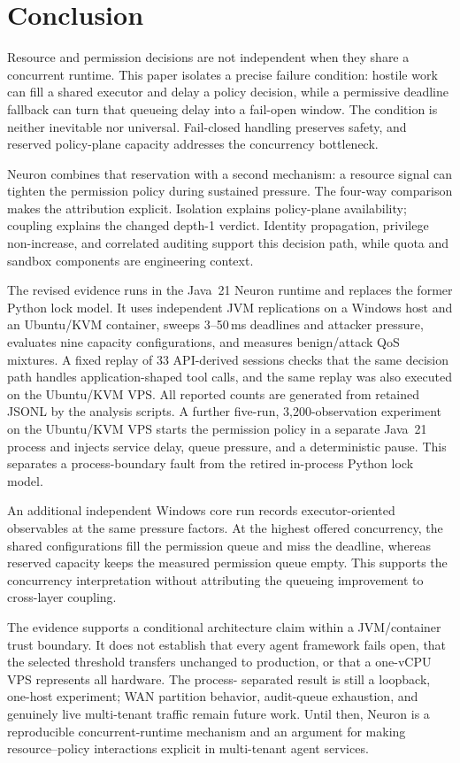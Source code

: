 \section{Conclusion}
\label{sec:conc}

Resource and permission decisions are not independent when they share a
concurrent runtime. This paper isolates a precise failure condition: hostile
work can fill a shared executor and delay a policy decision, while a
permissive deadline fallback can turn that queueing delay into a fail-open
window. The condition is neither inevitable nor universal. Fail-closed
handling preserves safety, and reserved policy-plane capacity addresses the
concurrency bottleneck.

Neuron combines that reservation with a second mechanism: a resource signal
can tighten the permission policy during sustained pressure. The four-way
comparison makes the attribution explicit. Isolation explains policy-plane
availability; coupling explains the changed depth-1 verdict. Identity
propagation, privilege non-increase, and correlated auditing support this
decision path, while quota and sandbox components are engineering context.

The revised evidence runs in the Java~21 Neuron runtime and replaces the
former Python lock model. It uses independent JVM replications on a Windows
host and an Ubuntu/KVM container, sweeps 3--50\,ms deadlines and attacker
pressure, evaluates nine capacity configurations, and measures benign/attack
QoS mixtures. A fixed replay of 33 API-derived sessions checks that the same
decision path handles application-shaped tool calls, and the same replay was
also executed on the Ubuntu/KVM VPS. All reported counts are generated from
retained JSONL by the analysis scripts. A further five-run,
3,200-observation experiment on the Ubuntu/KVM VPS starts the permission
policy in a separate Java~21 process and injects service delay, queue pressure,
and a deterministic pause. This separates a process-boundary fault from the
retired in-process Python lock model.

An additional independent Windows core run records executor-oriented
observables at the same pressure factors. At the highest offered concurrency,
the shared configurations fill the permission queue and miss the deadline,
whereas reserved capacity keeps the measured permission queue empty. This
supports the concurrency interpretation without attributing the queueing
improvement to cross-layer coupling.

The evidence supports a conditional architecture claim within a
JVM/container trust boundary. It does not establish that every agent
framework fails open, that the selected threshold transfers unchanged to
production, or that a one-vCPU VPS represents all hardware. The process-
separated result is still a loopback, one-host experiment; WAN partition
behavior, audit-queue exhaustion, and genuinely live multi-tenant traffic
remain future work.
Until then, Neuron is a reproducible concurrent-runtime mechanism and an
argument for making resource--policy interactions explicit in multi-tenant
agent services.
